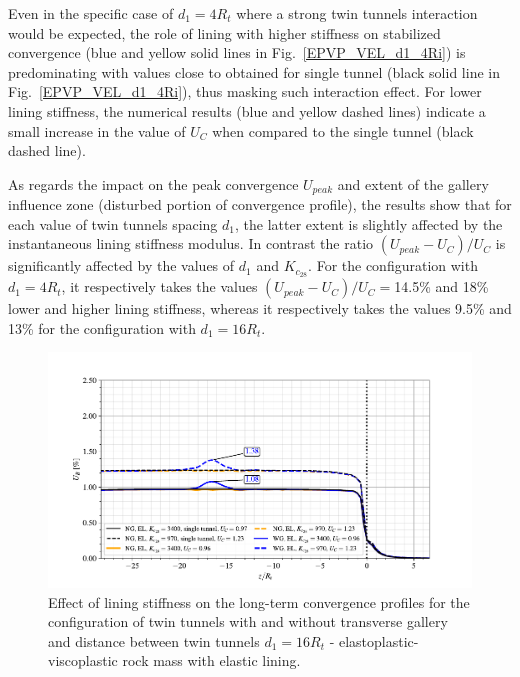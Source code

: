 \documentclass[Journal,letterpaper, NoLists,SectionNumbers]{ascelike-new}
\begin{document}
Even in the specific case of $d_1=4R_t$ where a strong twin tunnels interaction would be expected, the role of lining with higher stiffness on stabilized convergence (blue and yellow solid lines in Fig.~\ref{EPVP_VEL_d1_4Ri}) is predominating with values close to obtained for single tunnel (black solid line in Fig.~\ref{EPVP_VEL_d1_4Ri}), thus masking such interaction effect. For lower lining stiffness, the numerical results (blue and yellow dashed lines) indicate a small increase in the value of  $U_C$  when compared to the single tunnel (black dashed line).

As regards the impact on the peak convergence $U_{peak}$ and extent of the gallery influence zone (disturbed portion of convergence profile), the results show that for each value of twin tunnels spacing $d_1$, the latter extent is slightly affected by the instantaneous lining stiffness modulus. In contrast the ratio $(U_{peak}-U_C)/U_C$ is significantly affected by the values of $d_1$ and  $K_{c_{28}}$. For the configuration with $d_1=4R_t$, it respectively takes the values $(U_{peak}-U_C)/U_C=$14.5\% and 18\% lower and higher lining stiffness, whereas it respectively takes the values 9.5\% and 13\% for the configuration with $d_1=16R_t$. 

\begin{figure}[h!]
	\centering
	\includegraphics[scale=0.9]{Convergence Profiles - EPVP_EL_VEL_d1_16Ri_anotate.pdf}
	\caption{Effect of lining stiffness on the long-term convergence profiles for the configuration of twin tunnels with and without transverse gallery and distance between twin tunnels $d_1=16R_t$ - elastoplastic-viscoplastic rock mass with elastic lining.}
	\label{EPVP_EL_VEL_d1_16Ri}
\end{figure}
\end{document}
